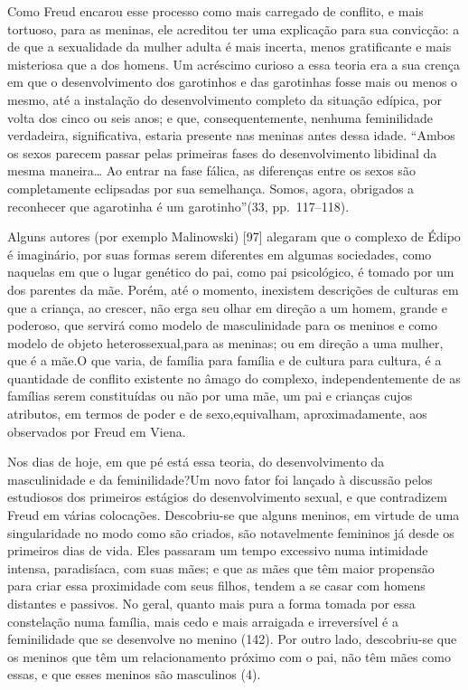  Como Freud encarou esse processo como mais carregado de conflito, e
mais tortuoso, para as meninas, ele acreditou ter uma explicação para
sua convicção: a de que a sexualidade da mulher adulta é mais incerta,
menos gratificante e mais misteriosa que a dos homens. Um acréscimo
curioso a essa teoria era a sua crença em que o desenvolvimento dos
garotinhos e das garotinhas fosse mais ou menos o mesmo, até a
instalação do desenvolvimento completo da situação edípica, por volta
dos cinco ou seis anos; e que, consequentemente, nenhuma feminilidade
verdadeira, significativa, estaria presente nas meninas antes dessa
idade. ``Ambos os sexos parecem passar pelas primeiras
fases do desenvolvimento libidinal da mesma maneira\ldots{} Ao entrar na
fase fálica,\idxfasef{} as diferenças entre os sexos são completamente eclipsadas
por sua semelhança. Somos, agora, obrigados a reconhecer que a\idxconfemeni[|)]
garotinha é um garotinho''\idxfreudedipo[|)] (33, pp.~117--118).

 Alguns autores (por exemplo\idxmalino{} Malinowski) [97] alegaram que o complexo de Édipo é imaginário, por suas formas serem diferentes em algumas sociedades, como naquelas em que o lugar genético do pai, como pai psicológico, é tomado por um dos parentes da mãe. Porém, até o momento, inexistem descrições de culturas\idxrelaconf{} em que a criança,\idxconfeestu{} ao crescer, não erga seu olhar em direção a um homem, grande e poderoso, que servirá como modelo de masculinidade\idxpaismasc{} para os meninos e como modelo de objeto heterossexual,\idxconfehete[|)] para as meninas; ou em direção a uma mulher, que é a mãe.\idxfeminsimb[|(] O que varia, de família para família e de cultura para cultura, é
a quantidade de conflito existente no âmago do complexo,
independentemente de as famílias serem constituídas ou não por uma mãe,
 um pai e crianças cujos atributos, em termos de poder e de sexo,\idxheteroconf[|)]
equivalham, aproximadamente, aos observados por Freud em Viena.

 Nos dias de hoje, em que pé está essa teoria, do desenvolvimento da
masculinidade e da feminilidade?\idxmaesdese[|(] Um novo fator foi lançado à discussão
pelos estudiosos dos primeiros estágios do desenvolvimento sexual, e
que contradizem Freud em várias colocações. Descobriu-se que alguns
meninos, em virtude de uma singularidade no modo como são criados, são
notavelmente femininos já desde os primeiros dias de vida. Eles
passaram um tempo excessivo numa intimidade intensa, paradisíaca, com
suas mães; e que as mães que têm maior propensão para criar essa
proximidade com seus filhos, tendem a se casar com homens distantes e
passivos. No geral, quanto mais pura a forma tomada por essa
constelação numa família, mais cedo e mais arraigada e irreversível é a
feminilidade que se desenvolve no menino (142). Por outro lado,
descobriu-se que os meninos que têm um relacionamento próximo com o
pai, não têm mães como essas, e que esses meninos são masculinos (4).

